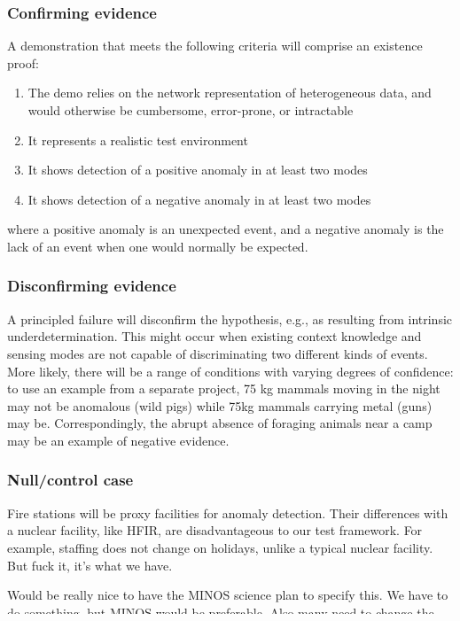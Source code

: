 \documentclass{article} %
\begin{document}
\subsubsection{Confirming evidence}
A demonstration that meets the following criteria will comprise an existence proof:
\begin{enumerate}
\item The demo relies on the network representation of heterogeneous data, and would otherwise be cumbersome, error-prone, or intractable
\item It represents a realistic test environment
\item It shows  detection of a positive anomaly in at least two modes
\item It shows detection of a negative anomaly in at least two modes
\end{enumerate}
\textellipsis where a positive anomaly is an unexpected event, and a negative anomaly is the lack of an event when one would normally be expected.

\subsubsection{Disconfirming evidence}
A principled failure will disconfirm the hypothesis, e.g., as resulting from intrinsic underdetermination. This might occur when existing context knowledge and sensing modes are not capable of discriminating two different kinds of events. More likely, there will be a range of conditions with varying degrees of confidence: to use an example from a separate project, 75 kg mammals moving in the night may not be anomalous (wild pigs) while 75kg mammals carrying metal (guns) may be. Correspondingly, the abrupt absence of foraging animals near a camp may be an example of negative evidence.

\subsubsection{Null/control case}
Fire stations will be proxy facilities for anomaly detection. Their differences with a nuclear facility, like HFIR, are disadvantageous to our test framework. For example, staffing does not change on holidays, unlike a typical nuclear facility. But fuck it, it's what we have.

{\color {red} Would be really nice to have the MINOS science plan to specify this. We have to do something, but MINOS would be preferable. Also many need to change the wording above. End of the day.}
\end{document}
